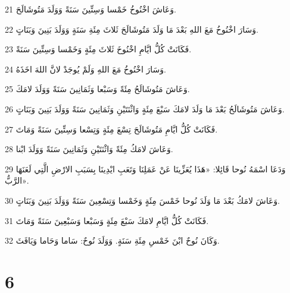 \par 21 وَعَاشَ اخْنُوخُ خَمْسا وَسِتِّينَ سَنَةً وَوَلَدَ مَتُوشَالَحَ.
\par 22 وَسَارَ اخْنُوخُ مَعَ اللهِ بَعْدَ مَا وَلَدَ مَتُوشَالَحَ ثَلاثَ مِئَةِ سَنَةٍ وَوَلَدَ بَنِينَ وَبَنَاتٍ.
\par 23 فَكَانَتْ كُلُّ ايَّامِ اخْنُوخَ ثَلاثَ مِئَةٍ وَخَمْسا وَسِتِّينَ سَنَةً.
\par 24 وَسَارَ اخْنُوخُ مَعَ اللهِ وَلَمْ يُوجَدْ لانَّ اللهَ اخَذَهُ.
\par 25 وَعَاشَ مَتُوشَالَحُ مِئَةً وَسَبْعا وَثَمَانِينَ سَنَةً وَوَلَدَ لامَكَ.
\par 26 وَعَاشَ مَتُوشَالَحُ بَعْدَ مَا وَلَدَ لامَكَ سَبْعَ مِئَةٍ وَاثْنَتَيْنِ وَثَمَانِينَ سَنَةً وَوَلَدَ بَنِينَ وَبَنَاتٍ.
\par 27 فَكَانَتْ كُلُّ ايَّامِ مَتُوشَالَحَ تِسْعَ مِئَةٍ وَتِسْعا وَسِتِّينَ سَنَةً وَمَاتَ.
\par 28 وَعَاشَ لامَكُ مِئَةً وَاثْنَتَيْنِ وَثَمَانِينَ سَنَةً وَوَلَدَ ابْنا.
\par 29 وَدَعَا اسْمَهُ نُوحا قَائِلا: «هَذَا يُعَزِّينَا عَنْ عَمَلِنَا وَتَعَبِ ايْدِينَا بِسَبَبِ الارْضِ الَّتِي لَعَنَهَا الرَّبُّ».
\par 30 وَعَاشَ لامَكُ بَعْدَ مَا وَلَدَ نُوحا خَمْسَ مِئَةٍ وَخَمْسا وَتِسْعِينَ سَنَةً وَوَلَدَ بَنِينَ وَبَنَاتٍ.
\par 31 فَكَانَتْ كُلُّ ايَّامِ لامَكَ سَبْعَ مِئَةٍ وَسَبْعا وَسَبْعِينَ سَنَةً وَمَاتَ.
\par 32 وَكَانَ نُوحٌ ابْنَ خَمْسِ مِئَةِ سَنَةٍ. وَوَلَدَ نُوحٌ: سَاما وَحَاما وَيَافَثَ.

\chapter{6}

